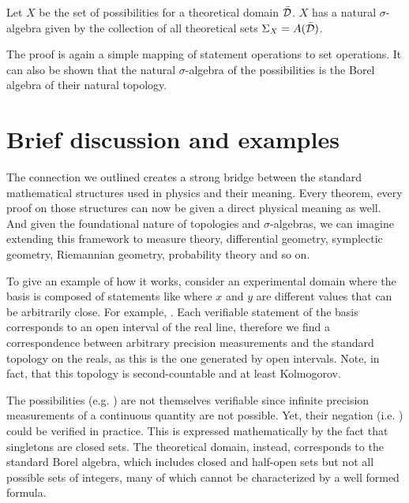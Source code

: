 \documentclass[letterpaper]{article}
\begin{document}
\begin{thrm}
	Let $X$ be the set of possibilities for a theoretical domain $\bar{\mathcal{D}}$. $X$ has a natural $\sigma$-algebra given by the collection of all theoretical sets $\Sigma_X=A(\bar{\mathcal{D}})$.
\end{thrm}

The proof is again a simple mapping of statement operations to set operations. It can also be shown that the natural $\sigma$-algebra of the possibilities is the Borel algebra of their natural topology.

\section{Brief discussion and examples}

The connection we outlined creates a strong bridge between the standard mathematical structures used in physics and their meaning. Every theorem, every proof on those structures can now be given a direct physical meaning as well. And given the foundational nature of topologies and $\sigma$-algebras, we can imagine extending this framework to measure theory, differential geometry, symplectic geometry, Riemannian geometry, probability theory and so on.

To give an example of how it works, consider an experimental domain where the basis is composed of statements like  where $x$ and $y$ are different values that can be arbitrarily close. For example, . Each verifiable statement of the basis corresponds to an open interval of the real line, therefore we find a correspondence between arbitrary precision measurements and the standard topology on the reals, as this is the one generated by open intervals. Note, in fact, that this topology is second-countable and at least Kolmogorov.

The possibilities (e.g. ) are not themselves verifiable since infinite precision measurements of a continuous quantity are not possible. Yet, their negation (i.e. ) could be verified in practice. This is expressed mathematically by the fact that singletons are closed sets. The theoretical domain, instead, corresponds to the standard Borel algebra, which includes closed and half-open sets but not all possible sets of integers, many of which cannot be characterized by a well formed formula.
\end{document}
